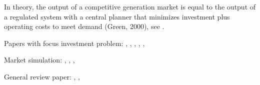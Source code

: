 In theory, the output of a competitive generation market is equal to the output of a regulated system with a central planner that minimizes investment plus operating costs to meet demand (Green, 2000), see \citep[see][pg. 111]{Rothwell2003}.

Papers with focus investment problem: \cite{Pineau2003}, \cite{Murphy2005}, \cite{Genc2007}, \cite{Kiesling2007}, \cite{Barmack2007}, \cite{Sauma2006}

Market simulation: \cite{Torre2003}, \cite{Valenzuela2007}, \cite{Hobbs2001},\cite{Otero-Novas2000}

General review paper: \cite{Neuhoff2005}, \cite{Ventosa2005}, \cite{Kahn1998}

